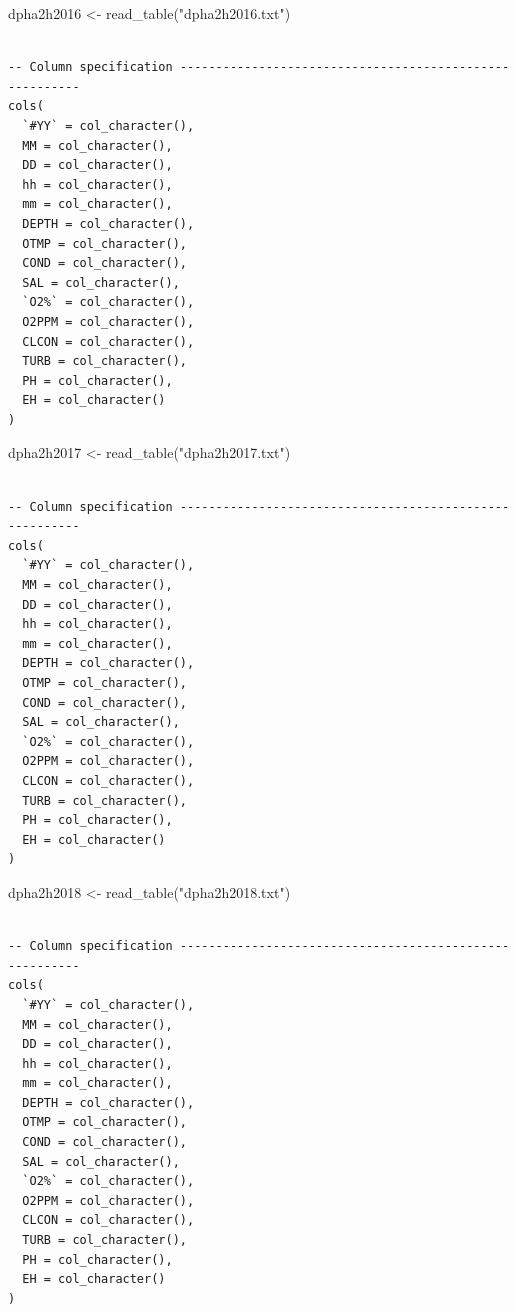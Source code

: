 \documentclass[
  letterpaper,
  DIV=11,
  numbers=noendperiod]{scrreprt}
\newenvironment{Shaded}{\begin{snugshade}}{\end{snugshade}}
\newcommand{\FunctionTok}[1]{\textcolor[rgb]{0.28,0.35,0.67}{#1}}
\newcommand{\NormalTok}[1]{\textcolor[rgb]{0.00,0.23,0.31}{#1}}
\newcommand{\OtherTok}[1]{\textcolor[rgb]{0.00,0.23,0.31}{#1}}
\newcommand{\StringTok}[1]{\textcolor[rgb]{0.13,0.47,0.30}{#1}}
\begin{document}
\begin{Shaded}
\begin{Highlighting}[]
\NormalTok{dpha2h2016 }\OtherTok{\textless{}{-}} \FunctionTok{read\_table}\NormalTok{(}\StringTok{"dpha2h2016.txt"}\NormalTok{)}
\end{Highlighting}
\end{Shaded}

\begin{verbatim}

-- Column specification --------------------------------------------------------
cols(
  `#YY` = col_character(),
  MM = col_character(),
  DD = col_character(),
  hh = col_character(),
  mm = col_character(),
  DEPTH = col_character(),
  OTMP = col_character(),
  COND = col_character(),
  SAL = col_character(),
  `O2%` = col_character(),
  O2PPM = col_character(),
  CLCON = col_character(),
  TURB = col_character(),
  PH = col_character(),
  EH = col_character()
)
\end{verbatim}

\begin{Shaded}
\begin{Highlighting}[]
\NormalTok{dpha2h2017 }\OtherTok{\textless{}{-}} \FunctionTok{read\_table}\NormalTok{(}\StringTok{"dpha2h2017.txt"}\NormalTok{)}
\end{Highlighting}
\end{Shaded}

\begin{verbatim}

-- Column specification --------------------------------------------------------
cols(
  `#YY` = col_character(),
  MM = col_character(),
  DD = col_character(),
  hh = col_character(),
  mm = col_character(),
  DEPTH = col_character(),
  OTMP = col_character(),
  COND = col_character(),
  SAL = col_character(),
  `O2%` = col_character(),
  O2PPM = col_character(),
  CLCON = col_character(),
  TURB = col_character(),
  PH = col_character(),
  EH = col_character()
)
\end{verbatim}

\begin{Shaded}
\begin{Highlighting}[]
\NormalTok{dpha2h2018 }\OtherTok{\textless{}{-}} \FunctionTok{read\_table}\NormalTok{(}\StringTok{"dpha2h2018.txt"}\NormalTok{)}
\end{Highlighting}
\end{Shaded}

\begin{verbatim}

-- Column specification --------------------------------------------------------
cols(
  `#YY` = col_character(),
  MM = col_character(),
  DD = col_character(),
  hh = col_character(),
  mm = col_character(),
  DEPTH = col_character(),
  OTMP = col_character(),
  COND = col_character(),
  SAL = col_character(),
  `O2%` = col_character(),
  O2PPM = col_character(),
  CLCON = col_character(),
  TURB = col_character(),
  PH = col_character(),
  EH = col_character()
)
\end{verbatim}
\end{document}
